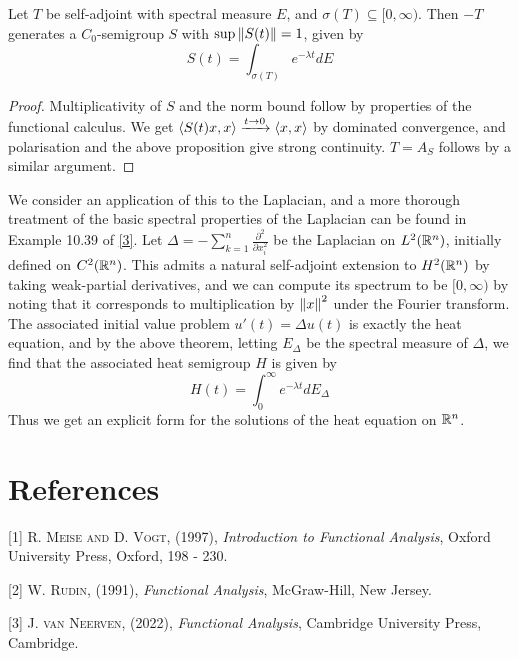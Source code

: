 \documentclass[10pt]{amsart}
\begin{document}
\begin{theorem}
    Let $T$ be self-adjoint with spectral measure $E$, and $\sigma(T) \subseteq [0, \infty)$. Then $-T$ generates a $C_0$-semigroup $S$ with $\sup\left\| S(t) \right\| = 1$, given by
    $$
        S(t) = \int_{\sigma(T)} e^{-\lambda t} dE
    $$
\end{theorem}
\begin{proof}
    Multiplicativity of $S$ and the norm bound follow by properties of the functional calculus. We get $\left\langle S(t)x, x \right\rangle \xrightarrow{t \to 0} \left\langle x, x \right\rangle$ by dominated convergence, and polarisation and the above proposition give strong continuity. $T = A_S$ follows by a similar argument.
\end{proof}
We consider an application of this to the Laplacian, and a more thorough treatment of the basic spectral properties of the Laplacian can be found in Example 10.39 of \hyperlink{jvn}{[3]}. Let $\Delta = -\sum_{k = 1}^n \frac{\partial^2}{\partial x_i^2}$ be the Laplacian on $L^2(\mathbb{R}^n)$, initially defined on $C^2(\mathbb{R}^n)$. This admits a natural self-adjoint extension to $H^2(\mathbb{R}^n)$ by taking weak-partial derivatives, and we can compute its spectrum to be $[0, \infty)$ by noting that it corresponds to multiplication by $\left\| x \right\|^2$ under the Fourier transform. The associated initial value problem $u'(t) = \Delta u(t)$ is exactly the heat equation, and by the above theorem, letting $E_\Delta$ be the spectral measure of $\Delta$, we find that the associated heat semigroup $H$ is given by
$$
    H(t) = \int_0^\infty e^{-\lambda t}dE_\Delta
$$
Thus we get an explicit form for the solutions of the heat equation on $\mathbb{R}^n$.








\section{References}



[1] \hypertarget{meisevogt}{\textsc{R. Meise and D. Vogt}, (1997), \emph{Introduction to Functional Analysis}, Oxford University Press, Oxford, 198 - 230.}

[2] \hypertarget{rudin}{\textsc{W. Rudin}, (1991), \emph{Functional Analysis}, McGraw-Hill, New Jersey.}

[3] \hypertarget{jvn}{\textsc{J. van Neerven}, (2022), \emph{Functional Analysis}, Cambridge University Press, Cambridge.}

\end{document}
